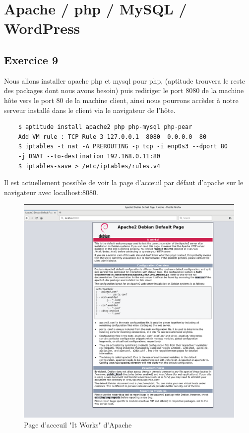 \documentclass{report}
\begin{document}
\section{Apache / php / MySQL / WordPress }
\subsection{Exercice 9}
Nous allons installer apache php et mysql pour php, (aptitude trouvera le reste des packages dont nous avons besoin)
puis rediriger le port 8080 de la machine hôte vers le port 80 de la machine client, ainsi
nous pourrons accèder à notre serveur installé dans le client
via le navigateur de l'hôte.

\begin{tcolorbox}
  \begin{verbatim}
    $ aptitude install apache2 php php-mysql php-pear
    Add VM rule : TCP Rule 3 127.0.0.1  8080  0.0.0.0  80
    $ iptables -t nat -A PREROUTING -p tcp -i enp0s3 --dport 80
    -j DNAT --to-destination 192.168.0.11:80
    $ iptables-save > /etc/iptables/rules.v4
  \end{verbatim}
\end{tcolorbox}
Il est actuellement possible de voir la page d'acceuil par défaut d'apache sur le navigateur avec
localhost:8080.\\
\begin{figure}[!htp]
  \includegraphics[scale=0.25]{resources/02.png}
  \caption{Page d'acceuil "It Works" d'Apache}
\end{figure}
\end{document}
